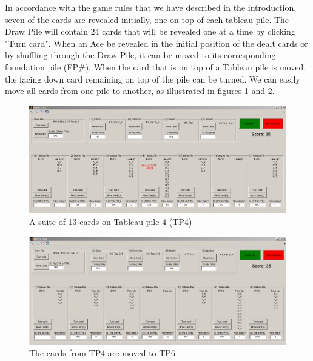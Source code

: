 \documentclass[runningheads,a4paper]{llncs}
\begin{document}
In accordance with the game rules that we have described in the introduction, seven of the cards are revealed initially, one on top of each tableau pile. The Draw Pile will contain 24 cards that will be revealed one at a time by clicking "Turn card".
When an Ace be revealed in the initial position of the dealt cards or by shuffling through the Draw Pile, it can be moved to its corresponding foundation pile (FP\#).
When the card that is on top of a Tableau pile is moved, the facing down card remaining on top of the pile can be turned. 
\newline
We can easily move all cards from one pile to another, as illustrated in figures \ref{fig:TP4full} and \ref{fig:TP6full}.
\begin{figure}
	\begin{center}
		\includegraphics[width=\textwidth]{images/moveMultiple_1}
		\caption{A suite of 13 cards on Tableau pile 4 (TP4)}
		\label{fig:TP4full}
	\end{center}
\end{figure}
\begin{figure}
 	\begin{center}
 		\includegraphics[width=\textwidth]{images/moveMultiple_2}
 		\caption{The cards from TP4 are moved to TP6}
 		\label{fig:TP6full}
 	\end{center}
 \end{figure}
\newline
\end{document}
